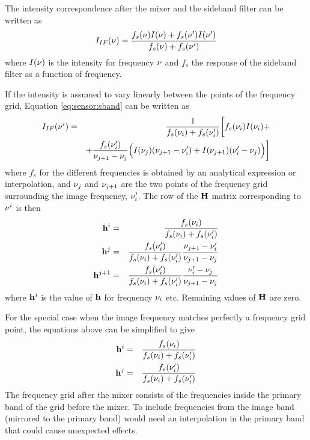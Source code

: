  The intensity correspondence after the mixer and the sideband filter
 can be written as
 \begin{equation}
   I_{IF}(\nu) = \frac{f_s(\nu)I(\nu)+f_s(\nu')I(\nu')}{f_s(\nu)+f_s(\nu')}
  \label{eq:sensor:sband}
 \end{equation}
 where $I(\nu)$ is the intensity for frequency $\nu$ and $f_s$ the response
 of the sideband filter as a function of frequency.

 If the intensity is assumed to vary linearly between the points of the
 frequency grid, Equation \ref{eq:sensor:sband} can be written as
 \begin{eqnarray}
   I_{IF}(\nu^i) &=& \frac{1}{f_s(\nu_i)+f_s(\nu_i')} \bigg[ f_s(\nu_i)I(\nu_i)+ \nonumber \\ 
      & & + \frac{f_s(\nu_i')}{\nu_{j+1}-\nu_j} \Big( I(\nu_j)(\nu_{j+1}-\nu_i')
           + I(\nu_{j+1})(\nu_i'-\nu_j) \Big)  \bigg]
  \label{eq:sensor:mixer}
 \end{eqnarray}
 where $f_s$ for the different frequencies is obtained by an analytical
 expression or interpolation, and $\nu_j$ and $\nu_{j+1}$ are the two points
 of the frequency grid surrounding the image frequency, $\nu_i'$. The row
 of the $\mathbf{H}$ matrix corresponding to $\nu^i$ is then
 \begin{eqnarray}
    \mathbf{h}^i &=& \frac{f_s(\nu_i)}{f_s(\nu_i)+f_s(\nu_i')}    \nonumber \\
    \mathbf{h}^j &=& \frac{f_s(\nu_i')}{f_s(\nu_i)+f_s(\nu_i')}
                  \frac{\nu_{j+1}-\nu_i'}{\nu_{j+1}-\nu_j}     \nonumber \\
    \mathbf{h}^{j+1} &=& \frac{f_s(\nu_i')}{f_s(\nu_i)+f_s(\nu_i')}
                  \frac{\nu_i'-\nu_j}{\nu_{j+1}-\nu_j}     \nonumber
 \end{eqnarray}
 where $\mathbf{h}^i$ is the value of $\mathbf{h}$ for frequency $\nu_i$ etc.
 Remaining values of $\mathbf{H}$ are zero.

 For the special case when the image frequency matches perfectly a frequency
 grid point, the equations above can be simplified to give
 \begin{eqnarray}
    \mathbf{h}^i &=& \frac{f_s(\nu_i)}{f_s(\nu_i)+f_s(\nu_i')}    \nonumber \\
    \mathbf{h}^j &=& \frac{f_s(\nu_i')}{f_s(\nu_i)+f_s(\nu_i')}    \nonumber
 \end{eqnarray}
 The frequency grid after the mixer consists of the frequencies inside
 the primary band of the grid before the mixer. To include frequencies
 from the image band (mirrored to the primary band) would need an 
 interpolation in the primary band that could cause unexpected effects.  
 
 






